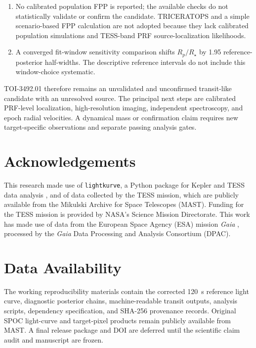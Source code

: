 \documentclass[11pt]{article}
\begin{document}
\begin{enumerate}
    screening tests.  SPOC~DV, Gaia~DR3, source-specific aperture, and
    first-pass difference-image checks do not provide calibrated source
    localization.  An all-phase regression is systematics-limited.
  \item No calibrated population FPP is reported; the available checks do
    not statistically validate or confirm the candidate.  TRICERATOPS and a
    simple scenario-based FPP calculation are not adopted because they lack
    calibrated population simulations and TESS-band PRF source-localization
    likelihoods.
  \item A converged fit-window sensitivity comparison shifts $R_p/R_\star$ by
    1.95 reference-posterior half-widths.  The descriptive reference intervals
    do not include this window-choice systematic.
\end{enumerate}

TOI-3492.01 therefore remains an unvalidated and unconfirmed transit-like
candidate with an unresolved source.  The principal next steps are calibrated
PRF-level localization, high-resolution imaging, independent spectroscopy,
and epoch radial velocities.  A dynamical mass or confirmation claim requires
new target-specific observations and separate passing analysis gates.



\section*{Acknowledgements}

This research made use of \texttt{lightkurve}, a Python package for Kepler
and TESS data analysis \citep{Lightkurve2018}, and of data collected by the
TESS mission, which are publicly available from the Mikulski Archive for
Space Telescopes (MAST).  Funding for the TESS mission is provided by NASA's
Science Mission Directorate.  This work has made use of data from the
European Space Agency (ESA) mission \textit{Gaia}
\citep{Vallenari2023}, processed by the \textit{Gaia} Data Processing and
Analysis Consortium (DPAC).


\section*{Data Availability}

The working reproducibility materials contain the corrected 120~s reference
light curve, diagnostic posterior chains, machine-readable transit outputs,
analysis scripts, dependency specification, and SHA-256 provenance records.
Original SPOC light-curve and target-pixel products remain publicly available
from MAST.  A final release package and DOI are deferred until the scientific
claim audit and manuscript are frozen.



\end{document}
